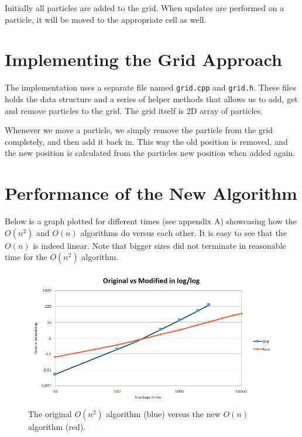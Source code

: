 \documentclass[a4paper,11pt,oneside]{book}
\begin{document}
Initially all particles are added to the grid. When updates are performed on a particle, it will be moved  to the
appropriate cell as well.

\section{Implementing the Grid Approach}


The implementation uses a separate file named \verb!grid.cpp! and \verb!grid.h!. These files holds the data structure
and a series of helper methods that allows us to add, get and remove particles to the grid. The grid itself is 2D array
of particles.

Whenever we move a particle, we simply remove the particle from the grid completely, and then add it back in. This way
the old position is removed, and the new position is calculated from the particles new position when added again. 

\section{Performance of the New Algorithm}

Below is a graph plotted for different times (see appendix A) showcasing how the $O(n^{2})$ and $O(n)$ algorithms do
versus each other. It is easy to see that the $O(n)$ is indeed linear. Note that bigger sizes did not terminate in
reasonable time for the $O(n^{2})$ algorithm.

\begin{figure}[H]
  \centering
  \begin{minipage}[b]{0.9\textwidth}
    \includegraphics[width=\textwidth]{graph_log.png}
    \caption{The original $O(n^{2})$ algorithm (blue) versus the new $O(n)$ algorithm (red).}
  \end{minipage}
\end{figure}
\end{document}
